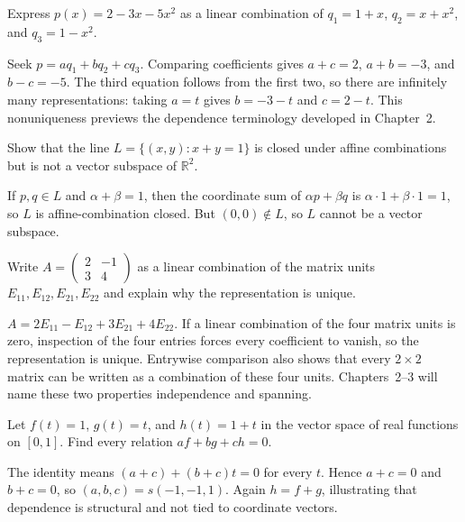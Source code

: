 \begin{problem}\label{prob:i01-problem-03}
Express $p(x)=2-3x-5x^2$ as a linear combination of $q_1=1+x$, $q_2=x+x^2$, and $q_3=1-x^2$.
\end{problem}
\begin{solution}
Seek $p=aq_1+bq_2+cq_3$. Comparing coefficients gives $a+c=2$, $a+b=-3$, and $b-c=-5$. The third equation follows from the first two, so there are infinitely many representations: taking $a=t$ gives $b=-3-t$ and $c=2-t$. This nonuniqueness previews the dependence terminology developed in Chapter~2.
\end{solution}

\begin{problem}\label{prob:i01-problem-04}
Show that the line $L=\{(x,y):x+y=1\}$ is closed under affine combinations but is not a vector subspace of $\mathbb R^2$.
\end{problem}
\begin{solution}
If $p,q\in L$ and $\alpha+\beta=1$, then the coordinate sum of $\alpha p+\beta q$ is $\alpha\cdot1+\beta\cdot1=1$, so $L$ is affine-combination closed. But $(0,0)\notin L$, so $L$ cannot be a vector subspace.
\end{solution}

\begin{problem}\label{prob:i01-problem-05}
Write $A=\begin{pmatrix}2&-1\\3&4\end{pmatrix}$ as a linear combination of the matrix units $E_{11},E_{12},E_{21},E_{22}$ and explain why the representation is unique.
\end{problem}
\begin{solution}
$A=2E_{11}-E_{12}+3E_{21}+4E_{22}$. If a linear combination of the four matrix units is zero, inspection of the four entries forces every coefficient to vanish, so the representation is unique. Entrywise comparison also shows that every $2\times2$ matrix can be written as a combination of these four units. Chapters~2--3 will name these two properties independence and spanning.
\end{solution}

\begin{problem}\label{prob:i01-problem-06}
Let $f(t)=1$, $g(t)=t$, and $h(t)=1+t$ in the vector space of real functions on $[0,1]$. Find every relation $af+bg+ch=0$.
\end{problem}
\begin{solution}
The identity means $(a+c)+(b+c)t=0$ for every $t$. Hence $a+c=0$ and $b+c=0$, so $(a,b,c)=s(-1,-1,1)$. Again $h=f+g$, illustrating that dependence is structural and not tied to coordinate vectors.
\end{solution}

